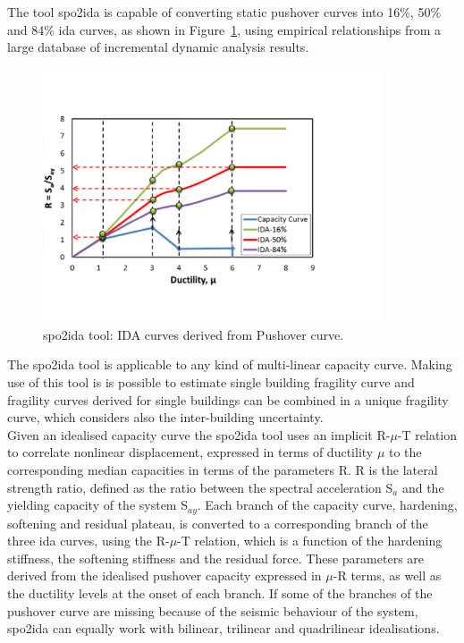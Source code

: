 The tool spo2ida \citep{VamvatsikosCornell2005} is capable of converting static pushover curves into 16\%, 50\% and 84\% ida curves, as shown in Figure~\ref{fig:spo2ida}, using empirical relationships from a large database of incremental dynamic analysis results.

\begin{figure}[!htbp]
\centering
\includegraphics[width=10cm]{figures/spo2ida.jpg}
\caption{spo2ida tool: IDA curves derived from Pushover curve.}
\label{fig:spo2ida}
\end{figure}

The spo2ida tool is applicable to any kind of multi-linear capacity curve. Making use of this tool is is possible to estimate single building fragility curve and fragility curves derived for single buildings can be combined in a unique fragility curve, which considers also the inter-building uncertainty.\\

Given an idealised capacity curve the spo2ida tool uses an implicit R-$\mu$-T relation to correlate nonlinear displacement, expressed in terms of ductility $\mu$ to the corresponding median capacities in terms of the parameters R. R is the lateral strength ratio, defined as the ratio between the spectral acceleration S$_a$ and the yielding capacity of the system S$_{ay}$. Each branch of the capacity curve, hardening, softening and residual plateau, is converted to a corresponding branch of the three ida curves, using the R-$\mu$-T relation, which is a function of the hardening stiffness, the softening stiffness and the residual force. These parameters are derived from the idealised pushover capacity expressed in $\mu$-R terms, as well as the ductility levels at the onset of each branch. If some of the branches of the pushover curve are missing because of the seismic behaviour of the system, spo2ida can equally work with bilinear, trilinear and quadrilinear idealisations.\\

